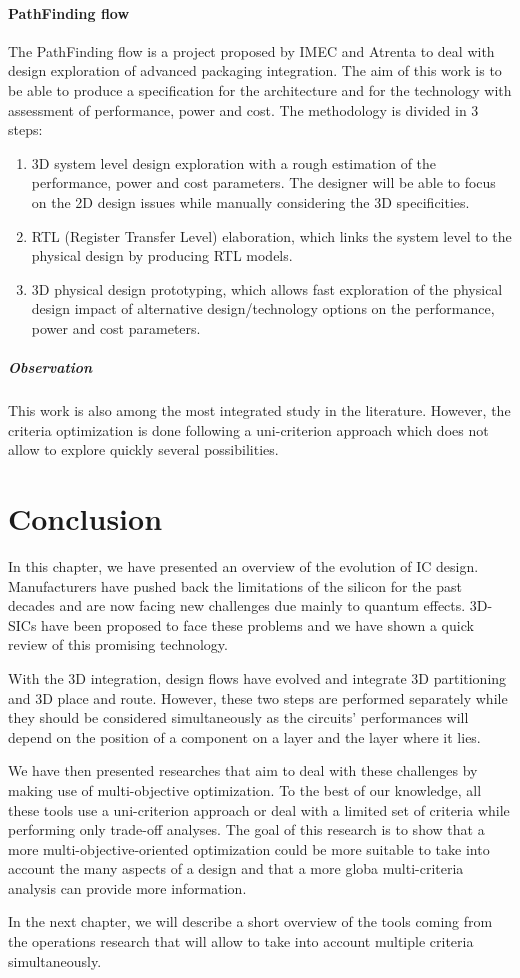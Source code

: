 \paragraph{PathFinding flow}
The PathFinding flow is a project proposed by IMEC and Atrenta \cite{5335663,DBLP:conf/3dic/MilojevicCCRRSAPM09} to deal with design exploration of advanced packaging integration. The aim of this work is to be able to produce a specification for the architecture and for the technology with assessment of performance, power and cost. The methodology is divided in 3 steps:
\begin{enumerate}
\item 3D system level design exploration with a rough estimation of the performance, power and cost parameters. The designer will be able to focus on the 2D design issues while manually considering the 3D specificities.
\item RTL (Register Transfer Level) elaboration, which links the system level to the physical design by producing RTL models.
\item 3D physical design prototyping, which allows fast exploration of the physical design impact of alternative design/technology options on the performance, power and cost parameters.
\end{enumerate}

\subparagraph{Observation}
This work is also among the most integrated study in the literature. However, the criteria optimization is done following a uni-criterion approach which does not allow to explore quickly several possibilities.

\section{Conclusion}
In this chapter, we have presented an overview of the evolution of IC design. Manufacturers have pushed back the limitations of the silicon for the past decades and are now facing new challenges due mainly to quantum effects. 3D-SICs have been proposed to face these problems and we have shown a quick review of this promising technology.

With the 3D integration, design flows have evolved and integrate 3D partitioning and 3D place and route. However, these two steps are performed separately while they should be considered simultaneously as the circuits' performances will depend on the position of a component on a layer and the layer where it lies.

We have then presented researches that aim to deal with these challenges by making use of multi-objective optimization. To the best of our knowledge, all these tools use a uni-criterion approach or deal with a limited set of criteria while performing only trade-off analyses. The goal of this research is to show that a more multi-objective-oriented optimization could be more suitable to take into account the many aspects of a design and that a more globa multi-criteria analysis can provide more information.

In the next chapter, we will describe a short overview of the tools coming from the operations research that will allow to take into account multiple criteria simultaneously.